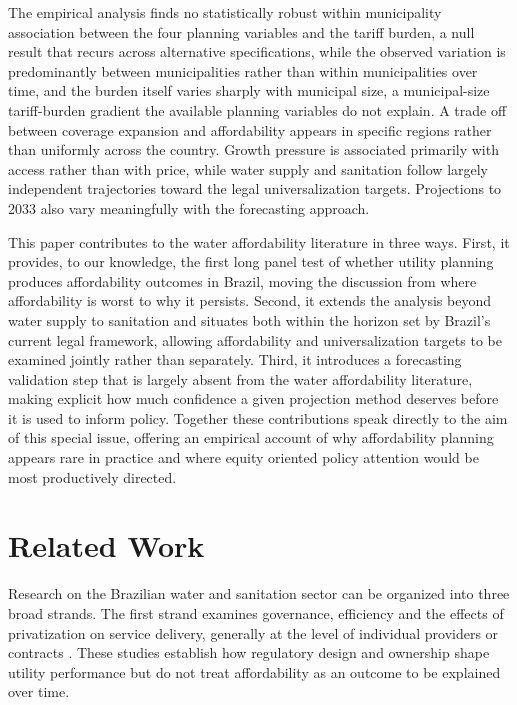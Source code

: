 \documentclass[pdflatex,sn-mathphys-num]{sn-jnl}%
\theoremstyle{thmstyleone}%
\theoremstyle{thmstyletwo}%
\theoremstyle{thmstylethree}%
\begin{document}
The empirical analysis finds no statistically robust within municipality association between the four planning variables and the tariff burden, a null result that recurs across alternative specifications, while the observed variation is predominantly between municipalities rather than within municipalities over time, and the burden itself varies sharply with municipal size, a municipal-size tariff-burden gradient the available planning variables do not explain. A trade off between coverage expansion and affordability appears in specific regions rather than uniformly across the country. Growth pressure is associated primarily with access rather than with price, while water supply and sanitation follow largely independent trajectories toward the legal universalization targets. Projections to 2033 also vary meaningfully with the forecasting approach.

This paper contributes to the water affordability literature in three ways. First, it provides, to our knowledge, the first long panel test of whether utility planning produces affordability outcomes in Brazil, moving the discussion from where affordability is worst to why it persists. Second, it extends the analysis beyond water supply to sanitation and situates both within the horizon set by Brazil's current legal framework, allowing affordability and universalization targets to be examined jointly rather than separately. Third, it introduces a forecasting validation step that is largely absent from the water affordability literature, making explicit how much confidence a given projection method deserves before it is used to inform policy. Together these contributions speak directly to the aim of this special issue, offering an empirical account of why affordability planning appears rare in practice and where equity oriented policy attention would be most productively directed.

\section{Related Work}\label{sec_related}

Research on the Brazilian water and sanitation sector can be organized into three broad strands. The first strand examines governance, efficiency and the effects of privatization on service delivery, generally at the level of individual providers or contracts \citep{Barbosa2024,Andres2024,Bermann2024,Fagundes2025c,Barra2026}. These studies establish how regulatory design and ownership shape utility performance but do not treat affordability as an outcome to be explained over time.
\end{document}
